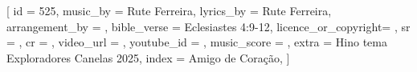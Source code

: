 [
    id                  = {525},
    music_by            = {Rute Ferreira}, %
    lyrics_by           = {Rute Ferreira}, %
    arrangement_by      = {}, %
    bible_verse         = {Eclesiastes 4:9-12},
    licence_or_copyright= {},
    sr                  = {},
    cr                  = {},
    video_url           = {}, %
    youtube_id          = {}, %
    music_score         = {}, %
    extra               = {Hino tema Exploradores Canelas 2025},
    index               = {Amigo de Coração},
]

